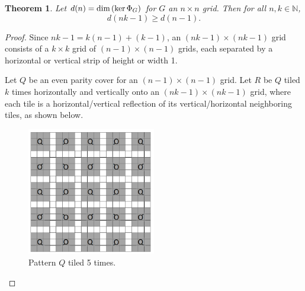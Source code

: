 \documentclass[a4paper]{article}
\newtheorem{theorem}{Theorem}
\newcommand{\N}{\mathbb{N}}
\renewcommand{\dim}[1]{\textnormal{dim}\left( #1 \right)}
\begin{document}
	\begin{theorem}\label{tiling-quiet-patterns}
		Let $d(n) = \dim{\ker{\Phi_G}}$ for $G$ an $n \times n$ grid.
		Then for all $n,k \in \N$,
		\begin{equation*}
			d(nk - 1) \geq d(n-1).
		\end{equation*}
	\end{theorem}
	\begin{proof}
		Since $nk - 1 = k(n-1) + (k-1)$, an $(nk-1) \times (nk-1)$ grid consists of a $k \times k$ grid of $(n-1) \times (n-1)$ grids, each separated by a horizontal or vertical strip of height or width 1.
	
		Let $Q$ be an even parity cover for an $(n-1) \times (n-1)$ grid.
		Let $R$ be $Q$ tiled $k$ times horizontally and vertically onto an $(nk-1) \times (nk-1)$ grid, where each tile is a horizontal/vertical reflection of its vertical/horizontal neighboring tiles, as shown below.
		
		\begin{figure}[H]
			\centering
%				
%				
%						
			\includegraphics[width=0.5\textwidth]{tiling_q.png}
			\caption{Pattern $Q$ tiled 5 times.}	
		\end{figure}
	

\end{proof}
\end{document}
